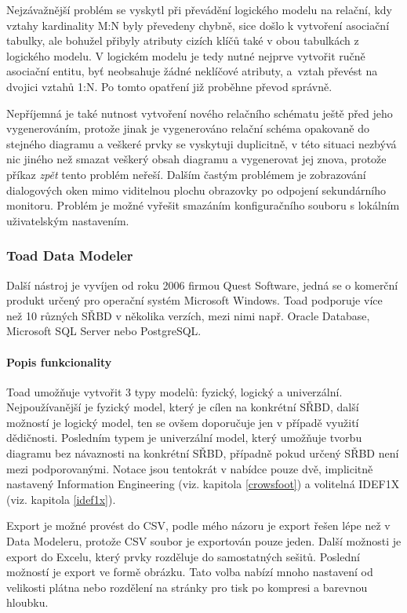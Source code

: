\documentclass[czech,bachelor,public,dept460,male,oneside]{diploma}
\begin{document}
		Nejzávažnější problém se vyskytl při převádění logického modelu na relační, kdy vztahy kardinality M:N byly převedeny chybně, sice došlo k vytvoření asociační tabulky, ale bohužel přibyly atributy cizích klíčů také v obou tabulkách z logického modelu. 
		V logickém modelu je tedy nutné nejprve vytvořit ručně asociační entitu, byť neobsahuje žádné neklíčové atributy, a~vztah převést na dvojici vztahů 1:N. Po tomto opatření již proběhne převod správně. 
		
		Nepříjemná je také nutnost vytvoření nového relačního schématu ještě před jeho vygenerováním, protože jinak je vygenerováno relační schéma opakovaně do stejného diagramu a veškeré prvky se vyskytuji duplicitně, v této situaci nezbývá nic jiného než smazat veškerý obsah diagramu a vygenerovat jej znova, protože příkaz \textit{zpět} tento problém neřeší. Dalším častým problémem je zobrazování dialogových oken mimo viditelnou plochu obrazovky po odpojení sekundárního monitoru. Problém je možné vyřešit smazáním konfiguračního souboru s lokálním uživatelským nastavením.
		
		\subsubsection{Toad Data Modeler}
		Další nástroj je vyvíjen od roku 2006 firmou Quest Software, jedná se o komerční produkt určený pro operační systém Microsoft Windows. Toad podporuje více než 10 různých SŘBD v několika verzích, mezi nimi např. Oracle Database, Microsoft SQL Server nebo PostgreSQL.
		
		\paragraph{Popis funkcionality}
		Toad umožňuje vytvořit 3 typy modelů: fyzický, logický a univerzální. Nejpoužívanější je fyzický model, který je cílen na konkrétní SŘBD, další možností je logický model, ten se ovšem doporučuje jen v případě využití dědičnosti. Posledním typem je univerzální model, který umožňuje tvorbu diagramu bez návaznosti na konkrétní SŘBD, případně pokud určený SŘBD není mezi podporovanými. Notace jsou tentokrát v nabídce pouze dvě, implicitně nastavený Information Engineering (viz. kapitola \ref{crowsfoot}) a volitelná IDEF1X (viz. kapitola \ref{idef1x}).
		
		Export je možné provést do CSV, podle mého názoru je export řešen lépe než v Data Modeleru, protože CSV soubor je exportován pouze jeden. Další možnosti je export do Excelu, který prvky rozděluje do samostatných sešitů. Poslední možností je export ve formě obrázku. Tato volba nabízí mnoho nastavení od velikosti plátna nebo rozdělení na stránky pro tisk po kompresi a barevnou hloubku.
		
\end{document}
